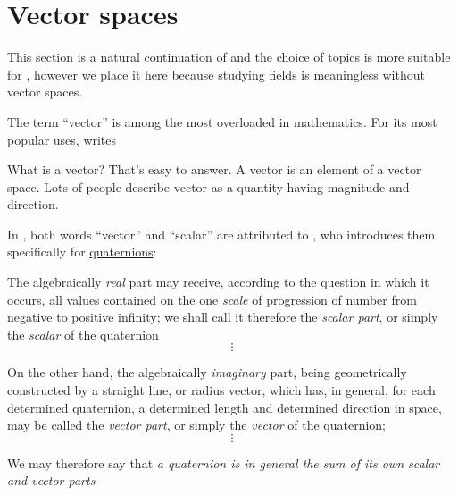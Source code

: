 \section{Vector spaces}\label{sec:vector_spaces}

This section is a natural continuation of  and the choice of topics is more suitable for , however we place it here because studying fields is meaningless without vector spaces.

\begin{remark}\label{rem:vector}
  The term \enquote{vector} is among the most overloaded in mathematics. For its most popular uses, \textcite[rem. B.1.6]{Sally2013Analysis} writes
  \begin{displayquote}
    What is a vector? That's easy to answer. A vector is an element of a vector space. Lots of people describe vector as a quantity having magnitude and direction.
  \end{displayquote}

  In \cite{MacTutor:EarliestUsesOfMathWordsV}, both words \enquote{vector} and \enquote{scalar} are attributed to \textcite{Hamilton2000Quaternions}, who introduces them specifically for \hyperref[def:quaternion_algebra]{quaternions}:
  \begin{displayquote}
    The algebraically \textit{real} part may receive, according to the question in which it occurs, all values contained on the one \textit{scale} of progression of number from negative to positive infinity; we shall call it therefore the \textit{scalar part}, or simply the \textit{scalar} of the quaternion \textellipsis
    \begin{equation*}
      \vdots
    \end{equation*}

    On the other hand, the algebraically \textit{imaginary} part, being geometrically constructed by a straight line, or radius vector, which has, in general, for each determined quaternion, a determined length and determined direction in space, may be called the \textit{vector part}, or simply the \textit{vector} of the quaternion; \textellipsis
    \begin{equation*}
      \vdots
    \end{equation*}

    We may therefore say that \textit{a quaternion is in general the sum of its own scalar and vector parts} \textellipsis
  \end{displayquote}


\end{remark}

